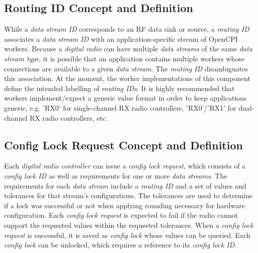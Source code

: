\documentclass{article}
\begin{document}
  \subsection{Routing ID Concept and Definition}
    While a \textit{data stream ID} corresponds to an RF data sink or source,
    a \textit{routing ID}
    associates a \textit{data stream ID} with an application-specific stream of
    OpenCPI workers. Because a \textit{digital radio} can have multiple
    \textit{data streams} of the same
    \textit{data stream type},
    it is possible that an application contains multiple workers whose
    connections are available to a given \textit{data stream}. The
    \textit{routing ID} disambiguates this association. At the moment, the worker
    implementations of this component define the intended labelling of
    \textit{routing IDs}. It is highly recommended
    that workers implement/expect a generic value format in
    order to keep applications generic, e.g. 'RX0' for
    single-channel RX radio controllers, 'RX0'/'RX1' for dual-channel
    RX radio controllers, etc.

  \subsection{Config Lock Request Concept and Definition}
    Each \textit{digital radio controller}
    can issue a \textit{config lock request}, which
    consists of a \textit{config lock ID} as well as
    requirements for one or more
    \textit{data streams}. The requirements for each \textit{data stream}
    include
    a \textit{routing ID} and a set of values and tolerances for that stream's
    configurations. The tolerances are used to determine
    if a lock was successful or not when applying rounding necessary for
    hardware configuration. Each \textit{config lock request} is expected to
    fail if the radio cannot support the requested values within the requested
    tolerances. When a \textit{config lock request} is successful, it is saved
    as
    \textit{config lock} whose values can be queried. Each \textit{config lock}
    can be
    unlocked, which requires a reference to its \textit{config lock ID}.
\end{document}

